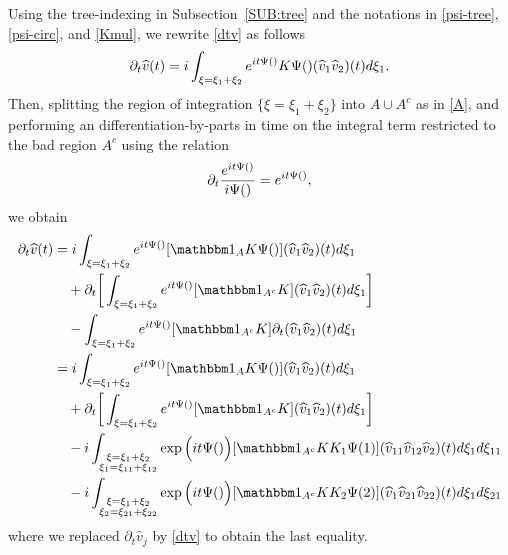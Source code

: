\documentclass[%
11pt,  reqno]{amsart}
\makeatletter
\newcommand{\5}{\textup{V}}
\newcommand{\ft}{\widehat}
\newcommand{\ind}{\mathbbm 1}
\newcommand{\dt}{\partial_t}
\theoremstyle{remark}
\def\<#1>{\csname MH@symb@#1\endcsname}
\numberwithin{equation}{section}
\numberwithin{theorem}{section}
\makeatother
\begin{document}
Using the tree-indexing in Subsection~\ref{SUB:tree} and the notations in \eqref{psi-tree}, \eqref{psi-circ}, and \eqref{Kmul}, we rewrite \eqref{dtv} as follows
\begin{align}
\label{duhamel2}
\dt\ft v(t) =  i \int_{\xi = \xi_1 + \xi_2} e^{it \Psi(\<1>)}  K \Psi(\<1>)   (\widehat{v}_{1} \widehat{v}_{2}) (t)
d\xi_{1}.
\end{align}
Then, splitting the region of integration $\{\xi=\xi_1+\xi_2\}$ into $A\cup A^c$ as in \eqref{A}, and performing an differentiation-by-parts in time on the integral term restricted to the bad region $A^c$ using the relation
$$
\dt\frac{e^{it\Psi(\<1>)}}{i\Psi(\<1>)}=e^{it\Psi(\<1>)},
$$ 
we obtain
\begin{align}
\label{NFE01}
\begin{split}
\dt\ft v(t)  
&=
i  \int_{\xi = \xi_1 + \xi_2} e^{it \Psi(\<1>)} 
[ \ind_{A} K \Psi(\<1>)   ]
(\ft v_{1} \ft v_{2} )(t)
d\xi_{1} 
\\
&
\quad 
+ \dt\bigg[ \int_{\xi = \xi_1 + \xi_2} e^{it \Psi(\<1>)} 
[\ind_{A^c}
 K ] 
(\ft v_{1} \ft v_{2} )(t)
d\xi_{1} 
\bigg]
\\
&
\quad 
-
   \int_{\xi = \xi_1 + \xi_2} e^{it \Psi(\<1>)} 
[ \ind_{A^c} K ]
\partial_{t} (\ft v_{1} \ft v_{2} )(t)
d\xi_{1} 
\\
& =
 i  \int_{\xi = \xi_1 + \xi_2} e^{it \Psi(\<1>)} 
[ \ind_{A} K \Psi(\<1>)   ]
(\ft v_{1} \ft v_{2} )(t)
d\xi_{1}  
\\
&
\quad 
+  \dt\bigg[ \int_{\xi = \xi_1 + \xi_2} e^{it \Psi(\<1>)} 
[\ind_{A^c}
 K ] 
(\ft v_{1} \ft v_{2} )(t)
d\xi_{1} 
\bigg]
\\
&
\quad 
- i
 \int_{\substack{\xi = \xi_1 + \xi_2 \\ \xi_1 = \xi_{11}+ \xi_{12}  }} \exp\Big(it \Psi(\<21>) \Big)
[ \ind_{A^c} K K_1 \Psi(1) ]
 (\ft v_{11} \ft v_{12} \ft v_2 )(t)
d\xi_{1} d\xi_{11} 
\\
&
\quad 
-i  \int_{\substack{\xi = \xi_1 + \xi_2 \\ \xi_2 = \xi_{21}+ \xi_{22}  }} \exp\Big(it \Psi(\<22>) \Big)
[ \ind_{A^c} K K_2 \Psi(2) ]
 (\ft v_{1} \ft v_{21} \ft v_{22} )(t)
d\xi_{1} d\xi_{21}
\end{split}
\end{align}
where we replaced $\dt \ft v_j$ by \eqref{dtv} to obtain the last equality. 


\end{document}
